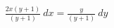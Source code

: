 \documentclass[preview]{standalone}
\begin{document}
\begin{align*}
\frac{2 x \left( y + 1 \right)}{\left( y + 1 \right)} \  dx = \frac{y}{\left( y + 1 \right)} \  dy
\end{align*}
\end{document}

